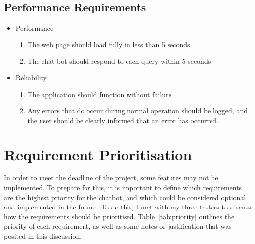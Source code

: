 \subsection{Performance Requirements}
\begin{itemize}
	\item Performance
	\begin{enumerate}[label*=P\arabic*.]
		\item The web page should load fully in less than 5 seconds
		\item The chat bot should respond to each query within 5 seconds
	\end{enumerate}
	\item Reliability
	\begin{enumerate}[resume*]
		\item The application should function without failure
		\item Any errors that do occur during normal operation should be logged, and the user should be clearly informed that an error has occurred.
	\end{enumerate}
\end{itemize}

\newpage
\section{Requirement Prioritisation}
\label{sec:priority}
In order to meet the deadline of the project, some features may not be implemented. To prepare for this, it is important to define which requirements are the highest priority for the chatbot, and which could be considered optional and implemented in the future. To do this, I met with my three testers to discuss how the requirements should be prioritised. Table~\ref{tab:priority} outlines the priority of each requirement, as well as some notes or justification that was posited in this discussion.

